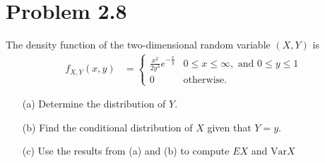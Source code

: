 \documentclass[10pt,a4paper]{article}
\author{Jeremiah Givens}
\theoremstyle{theorem}
\theoremstyle{definition}
\begin{document}
\section*{Problem 2.8}
The density function of the two-dimensional random variable $(X, Y)$ is
\begin{align*}
f_{X, Y}(x, y) &= \begin{cases} 
      \frac{x^2}{2 y^3} e^{- \frac{x}{y}} & 0 \leq x \leq \infty, \text{ and } 0 \leq y \leq 1 \\
      0 & \text{otherwise.}
   \end{cases}
\end{align*}
\begin{enumerate}
\item[(a)] Determine the distribution of $Y$.
\item[(b)] Find the conditional distribution of $X$ given that $Y = y$.
\item[(c)] Use the results from (a) and (b) to compute $EX$ and $\text{Var}X$
\end{enumerate}
\end{document}
